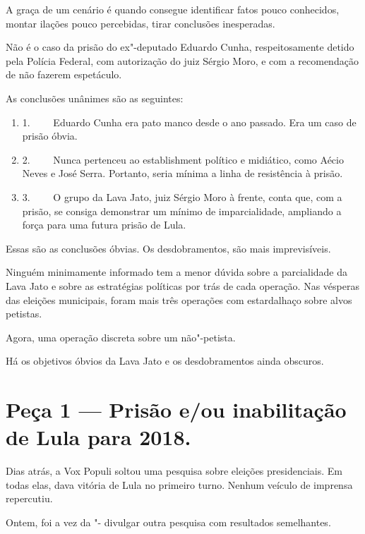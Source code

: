  

A graça de um cenário é quando consegue identificar fatos pouco
conhecidos, montar ilações pouco percebidas, tirar conclusões
inesperadas.

Não é o caso da prisão do ex"-deputado Eduardo Cunha, respeitosamente
detido pela Polícia Federal, com autorização do juiz Sérgio Moro, e com
a recomendação de não fazerem espetáculo.

As conclusões unânimes são as seguintes:

\begin{enumerate}
\itemsep1pt\parskip0pt
\item
  1.~~~~ Eduardo Cunha era pato manco desde o ano passado. Era um caso
  de prisão óbvia.
\item
  2.~~~~ Nunca pertenceu ao establishment político e midiático, como
  Aécio Neves e José Serra. Portanto, seria mínima a linha de
  resistência à prisão.
\item
  3.~~~~ O grupo da Lava Jato, juiz Sérgio Moro à frente, conta que, com
  a prisão, se consiga demonstrar um mínimo de imparcialidade, ampliando
  a força para uma futura prisão de Lula.
\end{enumerate}

Essas são as conclusões óbvias. Os desdobramentos, são mais
imprevisíveis.

Ninguém minimamente informado tem a menor dúvida sobre a parcialidade da
Lava Jato e sobre as estratégias políticas por trás de cada operação.
Nas vésperas das eleições municipais, foram mais três operações com
estardalhaço sobre alvos petistas.

Agora, uma operação discreta sobre um não"-petista.

Há os objetivos óbvios da Lava Jato e os desdobramentos ainda obscuros.

\section{Peça 1 --- Prisão e/\allowbreak{}ou inabilitação de Lula para 2018.}

Dias atrás, a Vox Populi soltou uma pesquisa sobre eleições
presidenciais. Em todas elas, dava vitória de Lula no primeiro turno.
Nenhum veículo de imprensa repercutiu.

Ontem, foi a vez da "- divulgar outra pesquisa com resultados
semelhantes.

